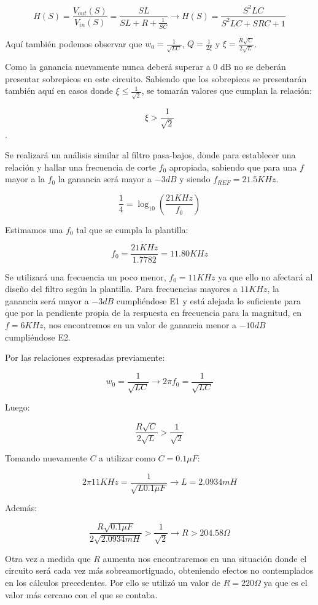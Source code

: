 $$H(S)=\frac{V_{out}(S)}{V_{in}(S)}=\frac{SL}{SL+R+\frac{1}{SC}} \longrightarrow H(S)=\frac{S^{2}LC}{S^2LC+SRC+1}$$

Aquí también podemos observar que $w_0=\frac{1}{\sqrt{LC}}$, $Q=\frac{1}{2\xi}$ y $\xi=\frac{R\sqrt{C}}{2\sqrt{L}}$.

Como la ganancia nuevamente nunca deberá superar a 0 dB no se deberán presentar sobrepicos en este circuito.
Sabiendo que los sobrepicos se presentarán también aquí en casos donde $\xi \leq \frac{1}{\sqrt{2}}$, se tomarán valores que cumplan la relación:

$$\xi > \frac{1}{\sqrt{2}}$$.

Se realizará un análisis similar al filtro pasa-bajos, donde para establecer una relación y hallar una frecuencia de corte $f_0$ apropiada, sabiendo que para una $f$
mayor a la $f_0$ la ganancia será mayor a $-3dB$ y siendo $f_{REF} = 21.5KHz$.


$$\frac{1}{4}=\log_{10}(\frac{21KHz}{f_0})$$

Estimamos una $f_0$ tal que se cumpla la plantilla:

$$f_0 = \frac{21KHz}{1.7782} = 11.80 KHz$$

Se utilizará una frecuencia un poco menor, $f_0=11 KHz$ ya que ello no afectará al diseño del filtro según la plantilla.
Para frecuencias mayores a $11 KHz$, la ganancia será mayor a $-3dB$ cumpliéndose E1 y está alejada lo suficiente para que por la pendiente
propia de la respuesta en frecuencia para la magnitud, en $f=6KHz$, nos encontremos en un valor de ganancia menor a $-10 dB$ cumpliéndose E2.

Por las relaciones expresadas previamente:

$$w_0=\frac{1}{\sqrt{LC}} \longrightarrow 2\pi f_0=\frac{1}{\sqrt{LC}}$$

Luego:

$$\frac{R\sqrt{C}}{2\sqrt{L}} > \frac{1}{\sqrt{2}}$$

Tomando nuevamente $C$ a utilizar como $C=0.1\mu F$: 

$$2\pi 11KHz=\frac{1}{\sqrt{L0.1 \mu F}} \longrightarrow L = 2.0934 mH$$

Además:

$$\frac{R\sqrt{0.1\mu F}}{2\sqrt{2.0934mH}} > \frac{1}{\sqrt{2}} \longrightarrow R > 204.58 \Omega $$

Otra vez a medida que $R$ aumenta nos encontraremos en una situación donde el circuito será
cada vez más sobreamortiguado, obteniendo efectos no contemplados en los cálculos precedentes. 
Por ello se utilizó un valor de $R= 220 \Omega$ ya que es el valor más cercano con el que se contaba.

